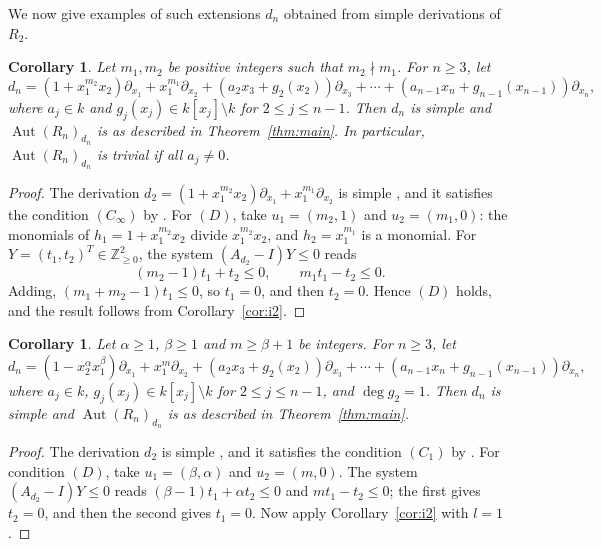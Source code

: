 \documentclass[11pt]{amsart}
\newtheorem{corollary}[theorem]{Corollary}
\theoremstyle{definition}
\theoremstyle{remark}
\numberwithin{equation}{theorem}
\newcommand{\Aut}{\operatorname{Aut}}
\newcommand{\Z}{\mathbb{Z}}
\begin{document}
We now give examples of such extensions $d_n$ obtained from simple derivations of $R_2$.

\begin{corollary}\label{cor:ex1}
Let $m_1,m_2$ be positive integers such that $m_2\nmid m_1$. For $n\ge3$, let
\[
d_n=(1+x_1^{m_2}x_2)\partial_{x_1}+x_1^{m_1}\partial_{x_2}+(a_2x_3+g_2(x_2))\partial_{x_3}+\cdots+(a_{n-1}x_n+g_{n-1}(x_{n-1}))\partial_{x_n},
\]
where $a_j\in k$ and $g_j(x_j)\in k[x_j]\setminus k$ for $2\le j\le n-1$. Then $d_n$ is simple and
$\Aut(R_n)_{d_n}$ is as described in Theorem~\ref{thm:main}. In particular, $\Aut(R_n)_{d_n}$ is trivial if
all $a_j\neq0$.
\end{corollary}

\begin{proof}
The derivation $d_2=(1+x_1^{m_2}x_2)\partial_{x_1}+x_1^{m_1}\partial_{x_2}$ is simple
\cite[Theorems~4.1 and~6.1]{Kou14}, and it satisfies the condition $(C_\infty)$ by \cite[Proposition 2.2]{PS26}.
For $(D)$, take $u_1=(m_2,1)$ and $u_2=(m_1,0)$: the monomials of $h_1=1+x_1^{m_2}x_2$ divide
$x_1^{m_2}x_2$, and $h_2=x_1^{m_1}$ is a monomial. For $Y=(t_1,t_2)^T\in\Z^2_{\ge0}$, the system
$(A_{d_2}-I)Y\le0$ reads
\[
(m_2-1)t_1+t_2\le0,\qquad m_1t_1-t_2\le0 .
\]
Adding, $(m_1+m_2-1)t_1\le0$, so $t_1=0$, and then $t_2=0$. Hence $(D)$ holds, and the result follows from
Corollary~\ref{cor:i2}.
\end{proof}

\begin{corollary}\label{cor:ex2}
Let $\alpha\ge1$, $\beta\ge1$ and $m\ge\beta+1$ be integers. For $n\ge3$, let
\[
d_n=(1-x_2^{\alpha}x_1^{\beta})\partial_{x_1}+x_1^{m}\partial_{x_2}+(a_2x_3+g_2(x_2))\partial_{x_3}+\cdots+(a_{n-1}x_n+g_{n-1}(x_{n-1}))\partial_{x_n},
\]
where $a_j\in k$, $g_j(x_j)\in k[x_j]\setminus k$ for $2\le j\le n-1$, and $\deg g_2=1$. Then $d_n$ is
simple and $\Aut(R_n)_{d_n}$ is as described in Theorem~\ref{thm:main}.
\end{corollary}

\begin{proof}
The derivation $d_2$ is simple \cite[Theorem~2.6]{SP25}, and it satisfies the condition $(C_1)$ by \cite[Propositions 2.8, 2.9]{PS26}.
For condition $(D)$, take $u_1=(\beta,\alpha)$ and $u_2=(m,0)$. The system $(A_{d_2}-I)Y\le0$ reads
$(\beta-1)t_1+\alpha t_2\le0$ and $mt_1-t_2\le0$; the first gives $t_2=0$, and then the second gives
$t_1=0$. Now apply Corollary~\ref{cor:i2} with $l=1$.
\end{proof}
\end{document}
